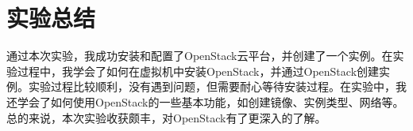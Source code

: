 \documentclass{article}
\begin{document}
\section{实验总结}

通过本次实验，我成功安装和配置了OpenStack云平台，并创建了一个实例。在实验过程中，我学会了如何在虚拟机中安装OpenStack，并通过OpenStack创建实例。实验过程比较顺利，没有遇到问题，但需要耐心等待安装过程。在实验中，我还学会了如何使用OpenStack的一些基本功能，如创建镜像、实例类型、网络等。总的来说，本次实验收获颇丰，对OpenStack有了更深入的了解。
\end{document}

